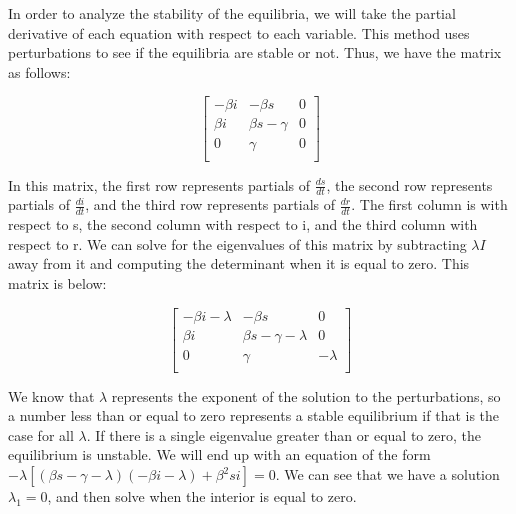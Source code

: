 \documentclass[12pt, a4paper]{article}
\begin{document}
        In order to analyze the stability of the equilibria, we will take the partial derivative of each equation with respect to each variable. This method uses perturbations to see if the equilibria are stable or not. Thus, we have the matrix as follows:
        
        $$\begin{bmatrix}
            -\beta i & -\beta s & 0 \\
            \beta i & \beta s - \gamma & 0 \\
            0 & \gamma & 0 \\
        \end{bmatrix}$$
        
        In this matrix, the first row represents partials of $\frac{ds}{dt}$, the second row represents partials of $\frac{di}{dt}$, and the third row represents partials of $\frac{dr}{dt}$. The first column is with respect to s, the second column with respect to i, and the third column with respect to r. We can solve for the eigenvalues of this matrix by subtracting $\lambda I$ away from it and computing the determinant when it is equal to zero. This matrix is below:
        
        $$\begin{bmatrix}
            -\beta i-\lambda & -\beta s & 0 \\
            \beta i & \beta s - \gamma-\lambda & 0 \\
            0 & \gamma & -\lambda \\
        \end{bmatrix}$$
        
        We know that $\lambda$ represents the exponent of the solution to the perturbations, so a number less than or equal to zero represents a stable equilibrium if that is the case for all $\lambda$. If there is a single eigenvalue greater than or equal to zero, the equilibrium is unstable. We will end up with an equation of the form $-\lambda [(\beta s - \gamma - \lambda)(-\beta i - \lambda) + \beta^2si]=0$. We can see that we have a solution $\lambda_1=0$, and then solve when the interior is equal to zero.
        
\end{document}
